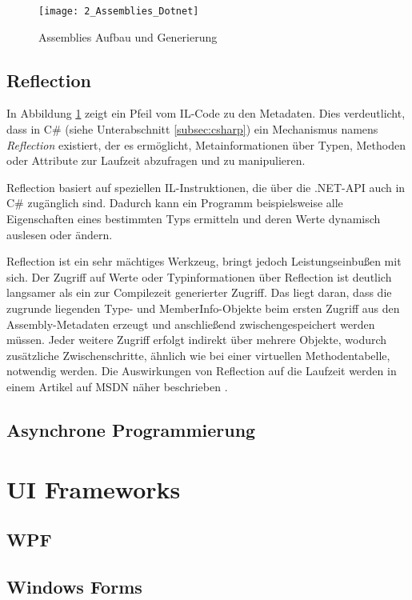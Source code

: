 \begin{figure}[H]
    \centering
    \texttt{[image: 2\_Assemblies\_Dotnet]}
    \caption{Assemblies Aufbau und Generierung}
    \label{fig:assemblies_dotnet}
\end{figure}

\subsection{Reflection}
\label{subsec:reflection}
In Abbildung \ref{fig:assemblies_dotnet} zeigt ein Pfeil vom IL-Code zu den Metadaten. Dies verdeutlicht, dass in C\# (siehe Unterabschnitt \ref{subsec:csharp}) ein Mechanismus namens \textit{Reflection} \cite{MicrosoftLearn_Reflection} existiert, der es ermöglicht, Metainformationen über Typen, Methoden oder Attribute zur Laufzeit abzufragen und zu manipulieren. 

Reflection basiert auf speziellen IL-Instruktionen, die über die .NET-API auch in C\# zugänglich sind. Dadurch kann ein Programm beispielsweise alle Eigenschaften eines bestimmten Typs ermitteln und deren Werte dynamisch auslesen oder ändern. 

Reflection ist ein sehr mächtiges Werkzeug, bringt jedoch Leistungseinbußen mit sich. Der Zugriff auf Werte oder Typinformationen über Reflection ist deutlich langsamer als ein zur Compilezeit generierter Zugriff. Das liegt daran, dass die zugrunde liegenden Type- und MemberInfo-Objekte beim ersten Zugriff aus den Assembly-Metadaten erzeugt und anschließend zwischengespeichert werden müssen. Jeder weitere Zugriff erfolgt indirekt über mehrere Objekte, wodurch zusätzliche Zwischenschritte, ähnlich wie bei einer virtuellen Methodentabelle, notwendig werden. Die Auswirkungen von Reflection auf die Laufzeit werden in einem Artikel auf MSDN näher beschrieben \cite{Pobar2005_PerformancePitfalls}.


\subsection{Asynchrone Programmierung}
\label{subsec:async}

\section{UI Frameworks}
\label{sec:ui_frameworks}

\subsection{WPF}
\label{subsec:WPF}

\subsection{Windows Forms}
\label{subsec:Winforms}


